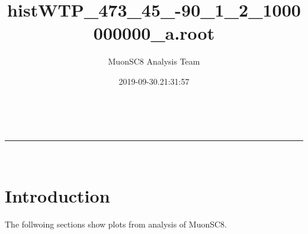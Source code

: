 \documentclass[a4paper,11pt]{article}
\makeatletter
\newcommand{\linia}{\rule{\linewidth}{0.5pt}}
\theoremstyle{mytheor}
\renewcommand{\maketitle}{
\begin{center}
\vspace{2ex}
{\huge \textsc{\@title}}
\vspace{1ex}
\\
\linia\\
\@author \hfill \@date
\vspace{4ex}
\end{center}
}
\makeatother
\begin{document}
\title{histWTP\_473\_45\_-90\_1\_2\_1000000000\_a.root}

\author{MuonSC8 Analysis Team }

\date{2019-09-30.21:31:57}

\maketitle

\section{Introduction}

The follwoing sections show plots from analysis of MuonSC8. 





\end{document}
